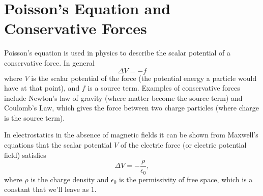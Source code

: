 \section*{Poisson's Equation and Conservative Forces}
Poisson's equation is used in physics to describe the scalar potential of a conservative force.
In general
\[ \Delta V = - f\]
where $V$ is the scalar potential of the force (the potential energy a particle would have at that point), and $f$ is a source term.
Examples of conservative forces include Newton's law of gravity (where matter become the source term) and Coulomb's Law, which gives the force between two charge particles (where charge is the source term).

In electrostatics in the absence of magnetic fields it can be shown from Maxwell's equations that the scalar potential $V$ of the electric force (or electric potential field) satisfies
\[  \Delta V = -\frac{\rho}{\epsilon_0},\]
where $\rho$ is the charge density and $\epsilon_0$ is the permissivity of free space,
which is a constant that we'll leave as $1$. 

